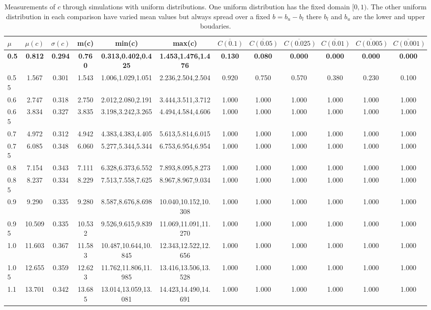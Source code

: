 \begin{table*}[h!]
\begin{center}
\begin{tabular}{| l | c | c | c | c | c | c | c | c | c | c | c |}\hline
$\mu$ & $\mu(c)$ & $\sigma(c)$ & m(c) & min(c) & max(c) & $\overline{C(0.1)}$ & $\overline{C(0.05)}$ & $\overline{C(0.025)}$ & $\overline{C(0.01)}$ & $\overline{C(0.005)}$ & $\overline{C(0.001)}$ \\\hline\hline
{\bf 0.5} & {\bf 0.812} & {\bf 0.294} & {\bf 0.760} & {\bf 0.313,0.402,0.425} & {\bf 1.453,1.476,1.476} & {\bf 0.130} & {\bf 0.080} & {\bf 0.000} & {\bf 0.000} & {\bf 0.000} & {\bf 0.000} \\\hline
0.55 & 1.567 & 0.301 & 1.543 & 1.006,1.029,1.051 & 2.236,2.504,2.504  & 0.920  & 0.750  & 0.570  & 0.380  & 0.230  & 0.100 \\\hline
0.6 & 2.747 & 0.318 & 2.750 & 2.012,2.080,2.191 & 3.444,3.511,3.712  & 1.000  & 1.000  & 1.000  & 1.000  & 1.000  & 1.000 \\\hline
0.65 & 3.834 & 0.327 & 3.835 & 3.198,3.242,3.265 & 4.494,4.584,4.606  & 1.000  & 1.000  & 1.000  & 1.000  & 1.000  & 1.000 \\\hline
0.7 & 4.972 & 0.312 & 4.942 & 4.383,4.383,4.405 & 5.613,5.814,6.015  & 1.000  & 1.000  & 1.000  & 1.000  & 1.000  & 1.000 \\\hline
0.75 & 6.085 & 0.348 & 6.060 & 5.277,5.344,5.344 & 6.753,6.954,6.954  & 1.000  & 1.000  & 1.000  & 1.000  & 1.000  & 1.000 \\\hline
0.8 & 7.154 & 0.343 & 7.111 & 6.328,6.373,6.552 & 7.893,8.095,8.273  & 1.000  & 1.000  & 1.000  & 1.000  & 1.000  & 1.000 \\\hline
0.85 & 8.237 & 0.334 & 8.229 & 7.513,7.558,7.625 & 8.967,8.967,9.034  & 1.000  & 1.000  & 1.000  & 1.000  & 1.000  & 1.000 \\\hline
0.9 & 9.290 & 0.335 & 9.280 & 8.587,8.676,8.698 & 10.040,10.152,10.308  & 1.000  & 1.000  & 1.000  & 1.000  & 1.000  & 1.000 \\\hline
0.95 & 10.509 & 0.335 & 10.532 & 9.526,9.615,9.839 & 11.069,11.091,11.270  & 1.000  & 1.000  & 1.000  & 1.000  & 1.000  & 1.000 \\\hline
1.0 & 11.603 & 0.367 & 11.583 & 10.487,10.644,10.845 & 12.343,12.522,12.656  & 1.000  & 1.000  & 1.000  & 1.000  & 1.000  & 1.000 \\\hline
1.05 & 12.655 & 0.359 & 12.623 & 11.762,11.806,11.985 & 13.416,13.506,13.528  & 1.000  & 1.000  & 1.000  & 1.000  & 1.000  & 1.000 \\\hline
1.1 & 13.701 & 0.342 & 13.685 & 13.014,13.059,13.081 & 14.423,14.490,14.691  & 1.000  & 1.000  & 1.000  & 1.000  & 1.000  & 1.000 \\\hline
\end{tabular}
\caption{Measurements of $c$ through simulations
with uniform distributions.
One uniform distribution has the fixed domain $[0,1)$.
The other uniform distribution in each comparison
have varied mean values but always
spread over a fixed $b=b_u-b_l$ there $b_l$ and $b_u$ are the lower and upper boudaries.}
\end{center}
\end{table*}